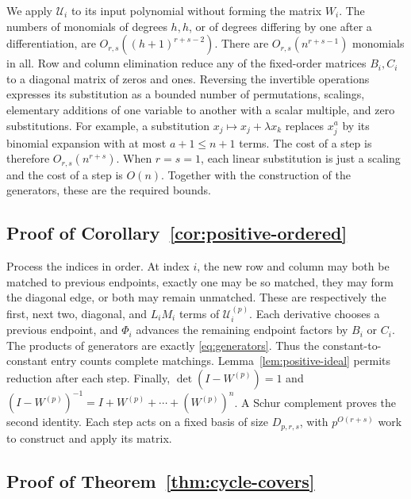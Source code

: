 \documentclass[11pt,reqno]{amsart}
\theoremstyle{remark}
\numberwithin{equation}{section}
\begin{document}
We apply \(\mathcal U_i\) to its input polynomial without forming the
matrix \(W_i\). The numbers of monomials of degrees \(h,h\), or of
degrees differing by one after a differentiation, are
\(O_{r,s}((h+1)^{r+s-2})\). There are \(O_{r,s}(n^{r+s-1})\) monomials in
all. Row and column elimination reduce any of the fixed-order matrices
\(B_i,C_i\) to a diagonal matrix of zeros and ones. Reversing the
invertible operations expresses its substitution as a bounded number of
permutations, scalings, elementary additions of one variable to another
with a scalar multiple, and zero substitutions. For example, a
substitution \(x_j\mapsto x_j+\lambda x_k\) replaces \(x_j^a\) by its
binomial expansion with at most \(a+1\leq n+1\) terms. The cost of a step
is therefore \(O_{r,s}(n^{r+s})\). When \(r=s=1\), each linear
substitution is just a scaling and the cost of a step is \(O(n)\).
Together with the construction of the generators, these are the required
bounds.

\subsection{Proof of Corollary~\ref{cor:positive-ordered}}

Process the indices in order. At index $i$, the new row and column
may both be matched to previous endpoints, exactly one may be so
matched, they may form the diagonal edge, or both may remain
unmatched. These are respectively the first, next two, diagonal,
and $L_iM_i$ terms of \(\mathcal U_i^{(p)}\). Each derivative
chooses a previous endpoint, and $\Phi_i$ advances the remaining
endpoint factors by $B_i$ or $C_i$. The products of generators are
exactly \eqref{eq:generators}. Thus the constant-to-constant entry
counts complete matchings. Lemma~\ref{lem:positive-ideal} permits reduction after
each step. Finally, $\det(I-W^{(p)})=1$ and
$(I-W^{(p)})^{-1}=I+W^{(p)}+\cdots+(W^{(p)})^n$. A Schur complement proves the second
identity. Each step acts on a fixed basis of size $D_{p,r,s}$,
with $p^{O(r+s)}$ work to construct and apply its matrix.

\subsection{Proof of Theorem~\ref{thm:cycle-covers}}
\end{document}
